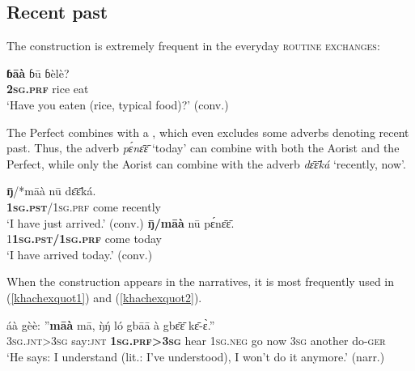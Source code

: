 \documentclass[output=paper,newtxmath,modfonts,nonflat,hidelinks]{langsci/langscibook}
\begin{document}
\subsection{Recent past}

The  construction is extremely frequent in the everyday \textsc{routine exchanges}:

\begin{exe} \ex
\gll	\textbf{ɓāà}	ɓū	ɓèlè?					\\
	\textbf{2\textsc{sg}.\textsc{prf}}	rice	eat					\\
\glt ‘Have you eaten (rice, typical food)?’ (conv.)
\end{exe}

The Perfect combines with a , which even excludes some adverbs denoting recent past. Thus, the adverb \textit{pɛ́nɛ̄ɛ̄} `today' can combine with both the Aorist and the Perfect, while only the Aorist can combine with the adverb \textit{dɛ̄ɛ̄ká} ‘recently, now’.

\begin{exe} \ex
\begin{xlist} \ex
\label{khachexdeeka}
\gll	\textbf{ŋ̄}/*māà	nū	dɛ̄ɛ̄ká.	\\
		\textbf{1\textsc{sg}.\textsc{pst}}/1\textsc{sg}.\textsc{prf}	come	recently	\\
\glt ‘I have just arrived.’ (conv.)
\ex
\label{khachexpenee}
\gll \textbf{ŋ̄/māà}	nū	pɛ́nɛ̄ɛ̄.		\\
		1\textbf{1\textsc{sg}.\textsc{pst}/1\textsc{sg}.\textsc{prf}}	come	today \\	
\glt ‘I have arrived today.’ (conv.)
\end{xlist}
\end{exe}

When the  construction appears in the narratives, it is most frequently used in  (\ref{khachexquot1}) and  (\ref{khachexquot2}).

\begin{exe} \ex
\label{khachexquot1}
\gll	áà	gèè:	”\textbf{māà}	mā,	ŋ̀ŋ́	ló	gbāā à	gbɛ̄ɛ̄	kɛ̄-ɛ̀.”\\
3\textsc{sg}.\textsc{jnt}>3\textsc{sg}	say:\textsc{jnt}	\textbf{1\textsc{sg}.\textsc{prf}>3\textsc{sg}}	hear	1\textsc{sg}.\textsc{neg}	go	now 3\textsc{sg}	another	    do-\textsc{ger}\\
\glt ‘He says: I understand (lit.: I've understood), I won’t do it anymore.’ (narr.)
\end{exe}
\end{document}
